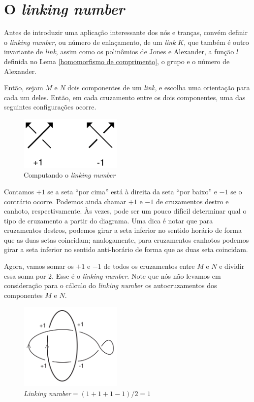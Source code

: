 	\section{O \textit{linking number}}
	\hspace{12pt} Antes de introduzir uma aplicação interessante dos nós e tranças, convém definir o \textit{linking number}, ou número de enlaçamento, de um \textit{link} $K$, que também é outro invariante de \textit{link}, assim como os polinômios de Jones e Alexander, a função $l$ definida no Lema \eqref{homomorfismo de comprimento}, o grupo e o número de Alexander.  
	\par\vspace{0.3cm} Então, sejam $M$ e $N$ dois componentes de um \textit{link}, e escolha uma orientação para cada um deles. Então, em cada cruzamento entre os dois componentes, uma das seguintes configurações ocorre.
	\begin{figure}[H]
		\begin{center}
			\includegraphics[width=5cm]{Images/linking_number.png}
		\end{center}\caption{Computando o \textit{linking number}}\label{linking number}
	\end{figure}
	\par\vspace{0.3cm} Contamos $+1$ se a seta ``por cima'' está à direita da seta ``por baixo'' e $-1$ se o contrário ocorre. Podemos ainda chamar $+1$ e $-1$ de cruzamentos destro e canhoto, respectivamente. Às vezes, pode ser um pouco difícil determinar qual o tipo de cruzamento a partir do diagrama. Uma dica é notar que para cruzamentos destros, podemos girar a seta inferior no sentido horário de forma que as duas setas coincidam; analogamente, para cruzamentos canhotos podemos girar a seta inferior no sentido anti-horário de forma que as duas seta coincidam.
	\par\vspace{0.3cm} Agora, vamos somar os $+1$ e $-1$ de todos os cruzamentos entre $M$ e $N$ e dividir essa soma por $2$. Esse é o \textit{linking number}. Note que nós não levamos em consideração para o cálculo do \textit{linking number} os autocruzamentos dos componentes $M$ e $N$. 
	\begin{figure}[H]
		\begin{center}
			\includegraphics[width=5cm]{Images/exemplo_linking_number.png}
		\end{center}\caption{\textit{Linking number}$ = (1+1+1-1)/2 = 1$}\label{exemplo linking number}
	\end{figure}
